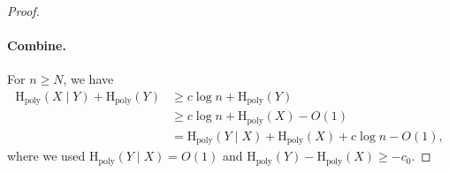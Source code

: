 \documentclass[twoside]{article}
\newcommand{\rH}{\mathrm{H}}
\begin{document}
\begin{proof}
\paragraph{Combine.}
For $n\ge N$, we have
\begin{align}
\rH_{\mathrm{poly}}(X\mid Y)+\rH_{\mathrm{poly}}(Y)
&\ge c\log n + \rH_{\mathrm{poly}}(Y)\\
& \ge c\log n + \rH_{\mathrm{poly}}(X) - O(1) \\
&= \rH_{\mathrm{poly}}(Y\mid X)+\rH_{\mathrm{poly}}(X)+c\log n - O(1),
\end{align}
where we used $\rH_{\mathrm{poly}}(Y\mid X)=O(1)$ and $\rH_{\mathrm{poly}}(Y)-\rH_{\mathrm{poly}}(X)\ge -c_0$.
%
%
%
%
%
%
%
%
%
%
%
%
%
%
%
\end{proof}



%
%
%
%
%
%
%
%
%
%
%
%
%
%
%


%
%
%
%
%
%
%
%
%
%
%
%
%
%
%
%
%
%
%
%
%
%
%
%
%
%
%
%

%
%
%
%
%
%
%
%
%

%
%
%
%

%
%
%
%
%
%
%
%
%
%
%
%
%
%
%
%
%
%
%
%
%
%
%
%
%
%
%
%
%
%

%
%
%
%
%
\end{document}

